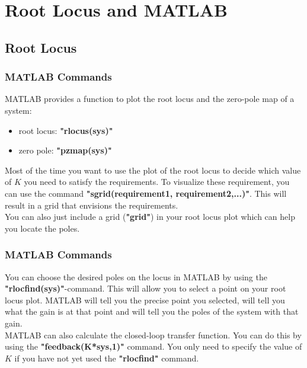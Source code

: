 \section{Root Locus and MATLAB}

\subsection{Root Locus}

\begin{frame}
\frametitle{MATLAB Commands}
	\justify
	MATLAB provides a function to plot the root locus and the zero-pole map of a system:
	\begin{itemize}
		\item root locus: \textbf{"rlocus(sys)"}
		\item zero pole: \textbf{"pzmap(sys)"}
	\end{itemize} 
	\vspace{1em}
	Most of the time you want to use the plot of the root locus to decide which value of $K$ you need to satisfy the requirements. To visualize these requirement, you can use the command \textbf{"sgrid(requirement1, requirement2,...)"}. This will result in a grid that envisions the requirements.\\
	\vspace{1em}
	You can also just include a grid (\textbf{"grid"}) in your root locus plot which can help you locate the poles.
\end{frame}

\begin{frame}
\frametitle{MATLAB Commands}
\justify
	You can choose the desired poles on the locus in MATLAB by using the \textbf{"rlocfind(sys)"}-command. This will allow you to select a point on your root locus plot. MATLAB will tell you the precise point you selected, will tell you what the gain is at that point and will tell you the poles of the system with that gain.\\
	\vspace{1em}
	MATLAB can also calculate the closed-loop transfer function. You can do this by using the \textbf{"feedback(K*sys,1)"} command. You only need to specify the value of $K$ if you have not yet used the \textbf{"rlocfind"} command.
\end{frame}


